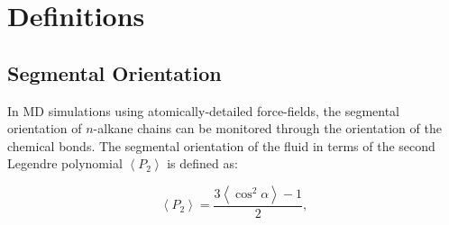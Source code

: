 \documentclass[5p]{elsarticle}
\begin{document}


\appendix

\section{Definitions}

\subsection{Segmental Orientation}

In MD simulations using atomically-detailed force-fields, the segmental orientation of $n$-alkane chains can be monitored through the orientation of the chemical bonds. The segmental orientation \cite{Erman1985} of the fluid in terms of the second Legendre polynomial $\left<P_2\right>$ is defined as:

\begin{equation}\label{eq:P_2}
\left\langle P_2 \right\rangle =\frac{3\left\langle \cos ^2 \alpha \right\rangle - 1}{2},
\end{equation}
\end{document}
